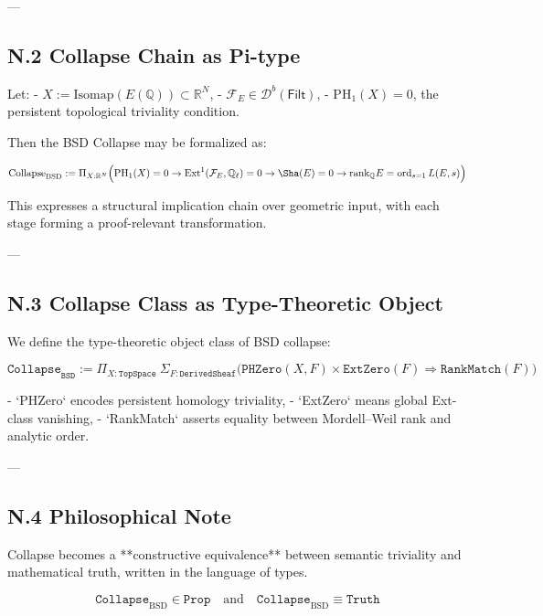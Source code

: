 \documentclass[11pt]{article}
\theoremstyle{definition}
\begin{document}
---

\subsection*{N.2 Collapse Chain as Pi-type}

Let:
- \( X := \mathrm{Isomap}(E(\mathbb{Q})) \subset \mathbb{R}^N \),
- \( \mathcal{F}_E \in \mathcal{D}^b(\mathsf{Filt}) \),
- \( \mathrm{PH}_1(X) = 0 \), the persistent topological triviality condition.

Then the BSD Collapse may be formalized as:

\[
\mathrm{Collapse}_{\mathrm{BSD}} := 
\Pi_{X : \mathbb{R}^N} \Big(
\mathrm{PH}_1(X) = 0 \to 
\mathrm{Ext}^1(\mathcal{F}_E, \mathbb{Q}_\ell) = 0 \to 
\Sha(E) = 0 \to 
\mathrm{rank}_\mathbb{Q} E = \operatorname{ord}_{s=1} L(E,s)
\Big)
\]

This expresses a structural implication chain over geometric input,  
with each stage forming a proof-relevant transformation.

---

\subsection*{N.3 Collapse Class as Type-Theoretic Object}

We define the type-theoretic object class of BSD collapse:

\[
\texttt{Collapse}_{\texttt{BSD}} := 
\Pi_{X : \texttt{TopSpace}} \ \Sigma_{F : \texttt{DerivedSheaf}} \Big(
\texttt{PHZero}(X, F) \times \texttt{ExtZero}(F) \Rightarrow \texttt{RankMatch}(F)
\Big)
\]

- `PHZero` encodes persistent homology triviality,
- `ExtZero` means global Ext-class vanishing,
- `RankMatch` asserts equality between Mordell–Weil rank and analytic order.

---

\subsection*{N.4 Philosophical Note}

Collapse becomes a **constructive equivalence** between  
semantic triviality and mathematical truth, written in the language of types.

\[
\boxed{
\texttt{Collapse}_{\mathrm{BSD}} \in \texttt{Prop}
}
\quad \text{and} \quad
\texttt{Collapse}_{\mathrm{BSD}} \equiv \texttt{Truth}
\]
\end{document}
